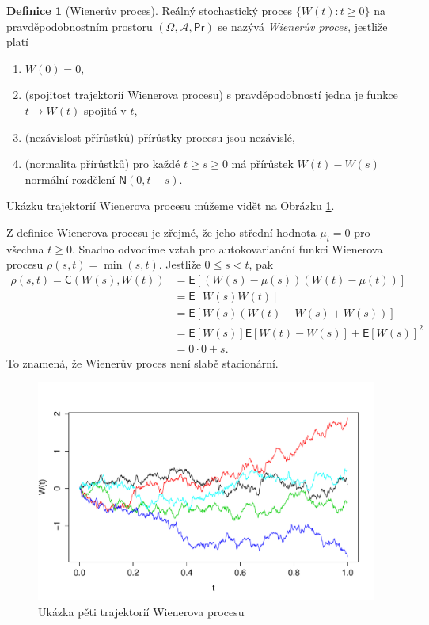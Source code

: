 \documentclass[a4paper,12pt]{report}
\theoremstyle{definition} \newtheorem{definice}[veta]{Definice}
\theoremstyle{remark}
\begin{document}
\begin{definice}[Wienerův proces]\label{WP_def}
Reálný stochastický proces $\{W(t):t\ge0\}$ na pravděpodobnostním prostoru $(\Omega,\mathcal{A},\mathsf{Pr})$ se nazývá \textit{Wienerův proces}, jestliže platí
\begin{enumerate}
\item$W(0)=0$, 
\item(spojitost trajektorií Wienerova procesu) s pravděpodobností jedna je funkce $t\to W(t)$ spojitá v $t$,
\item(nezávislost přírůstků) přírůstky procesu jsou nezávislé,
\item(normalita přírůstků) pro každé $t\ge s\ge0$ má přírůstek $W(t)-W(s)$ normální rozdělení $\mathsf{N}(0, t-s)$.
\end{enumerate}
\end{definice}

Ukázku trajektorií Wienerova procesu můžeme vidět na Obrázku \ref{WP_graf}.

Z definice Wienerova procesu je zřejmé, že jeho střední hodnota $\mu_t=0$ pro všechna $t\ge0$.
Snadno odvodíme vztah pro autokovarianční funkci Wienerova procesu $\rho(s,t)=\min(s,t)$.
Jestliže $0\leq s<t$, pak
\begin{align*}
\rho(s,t)=\mathsf{C}(W(s),W(t))&=\mathsf{E}{\left[(W(s)-\mu(s))(W(t)-\mu(t))\right]} \\
&=\mathsf{E}{\left[W(s)W(t)\right]}  \\
&=\mathsf{E}{\left[W(s)(W(t)-W(s)+W(s))\right]} \\
&=\mathsf{E}{\left[W(s)\right]}\mathsf{E}{\left[W(t)-W(s)\right]}+\mathsf{E}{\left[W(s)\right]}^2 \\
&=0\cdot0+s.
\end{align*}
To znamená, že Wienerův proces není slabě stacionární.

\begin{figure}[!htbp]
  \centering 
	\includegraphics[width=13.5cm, clip, trim= 0 15 25 40]{IMG/WP_v2.pdf}
  \caption{Ukázka pěti trajektorií Wienerova procesu}  \label{WP_graf}
\end{figure}
\end{document}
